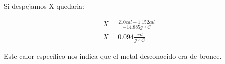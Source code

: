 \documentclass[12pt]{report}
\begin{document}
\normalsize{
\noindent
Si despejamos X quedaria:

\begin{eqnarray*}
X = \frac{210 cal - 1.152 cal}{-14.885 g\cdot^\circ C}\\
X = 0.094 \frac{cal}{g\cdot^\circ C}
\end{eqnarray*}

\noindent
Este calor específico nos indica que el metal desconocido era de bronce.
}
\end{document}
